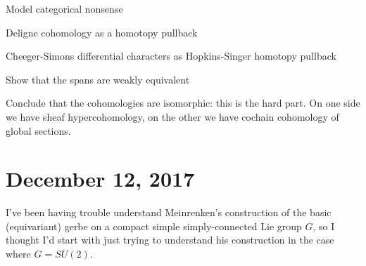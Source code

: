 \documentclass{amsart}
\begin{document}
Model categorical nonsense

Deligne cohomology as a homotopy pullback

Cheeger-Simons differential characters as Hopkins-Singer homotopy pullback

Show that the spans are weakly equivalent

Conclude that the cohomologies are isomorphic: this is the hard part. On
one side we have sheaf hypercohomology, on the other we have cochain cohomology
of global sections.

\section{December 12, 2017}

I've been having trouble understand Meinrenken's construction of the basic
(equivariant) gerbe on a compact simple simply-connected Lie group $G$, so
I thought I'd start with just trying to understand his construction in the
case where $G=SU(2)$.
\end{document}
